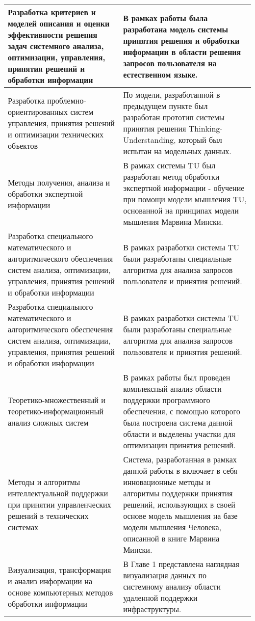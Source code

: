 \begin{longtable}{|p{7cm}|p{9cm}|}
\hline \hline
\endlastfoot
\hline
   Разработка критериев и моделей описания и оценки эффективности решения задач системного анализа, оптимизации, управления, принятия решений и обработки информации & В рамках работы была разработана модель системы принятия решения и обработки информации в области решения запросов пользователя на естественном языке. \\
   \hline
   Разработка проблемно-ориентированных систем управления, принятия решений и оптимизации технических объектов & По модели, разработанной в предыдущем пункте был разработан прототип системы принятия решения Thinking-Understanding, который был испытан на модельных данных.\\
   \hline
   Методы получения, анализа и обработки экспертной информации & В рамках системы TU был разработан метод обработки экспертной информации - обучение при помощи модели мышления TU, основанной на принципах модели мышления Марвина Мински. \\
   \hline
   Разработка специального математического и алгоритмического обеспечения систем анализа, оптимизации, управления, принятия решений и обработки информации & В рамках разработки системы TU были разработаны специальные алгоритма для анализа запросов пользователя и принятия решений.\\
  \hline 
  Разработка специального математического и алгоритмического обеспечения систем анализа, оптимизации, управления, принятия решений и обработки информации & В рамках разработки системы TU были разработаны специальные алгоритма для анализа запросов пользователя и принятия решений.\\
  \hline 
  Теоретико-множественный и теоретико-информационный анализ сложных систем & В рамках работы был проведен комплексный анализ области поддержки программного обеспечения, с помощью которого была построена система данной области и выделены участки для оптимизации принятия решений.\\
  \hline
  Методы и алгоритмы интеллектуальной поддержки при принятии управленческих решений в технических системах & Система, разработанная в рамках данной работы в включает в себя инновационные методы и алгоритмы поддержки принятия решений, использующих в своей основе модель мышления на базе модели мышления Человека, описанной в книге Марвина Мински. \\ 
  \hline
  Визуализация, трансформация и анализ информации на основе компьютерных методов обработки информации & В Главе 1 представлена наглядная визуализация данных по системному анализу области удаленной поддержки инфраструктуры. \\
  \hline	
\end{longtable}


